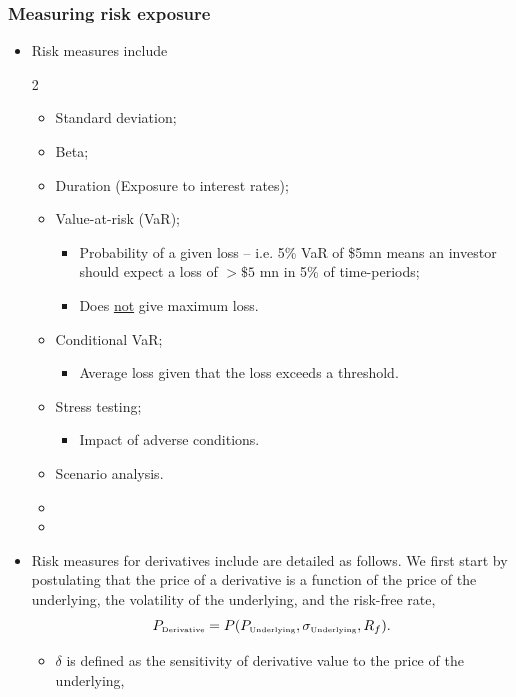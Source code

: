 \documentclass[../notes_compiled.tex]{subfiles}
\begin{document}
\subsubsection{Measuring risk exposure}
\begin{itemize}
\item Risk measures include
\begin{multicols}{2}
\begin{itemize}
\item Standard deviation;
\item Beta;
\item Duration (Exposure to interest rates);
\item Value-at-risk (VaR);
\begin{itemize}
\item Probability of a given loss -- i.e. 5\% VaR of \$5mn means an investor should expect a loss of $>\$5$ mn in 5\% of time-periods;
\item Does \underline{not} give maximum loss.
\end{itemize}
\item Conditional VaR;
\begin{itemize}
\item Average loss given that the loss exceeds a threshold.
\end{itemize}
\item Stress testing;
\begin{itemize}
\item Impact of adverse conditions.
\end{itemize}
\item Scenario analysis.
\item[]
\item[]
\end{itemize}
\end{multicols}
\item Risk measures for derivatives include are detailed as follows. We first start by postulating that the price of a derivative is a function of the price of the underlying, the volatility of the underlying, and the risk-free rate,
\begin{equation}
P_{\text{\tiny{Derivative}}} = P(P_{\text{\tiny{Underlying}}}, \sigma_{\text{\tiny{Underlying}}}, R_{f}).
\end{equation}
\begin{itemize}
\item $\delta$ is defined as the sensitivity of derivative value to the price of the underlying,
\begin{equation}

\end{equation}
\end{itemize}
\end{itemize}
\end{document}
